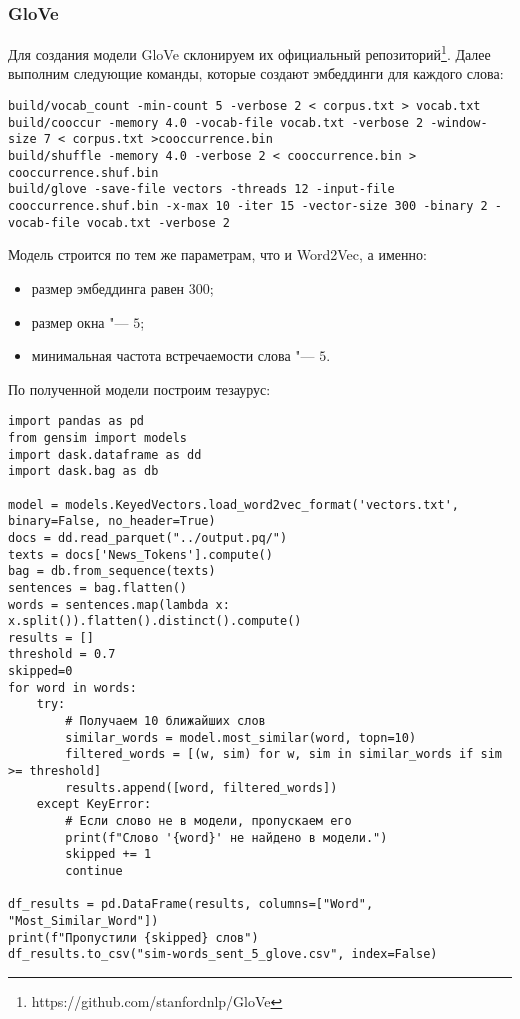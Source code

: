 \documentclass[coursework]{SCWorks}
\begin{document}
\subsubsection{GloVe}
Для создания модели GloVe склонируем их официальный репозиторий\footnote{https://github.com/stanfordnlp/GloVe}. Далее выполним следующие команды, которые создают эмбеддинги для каждого слова:
\begin{verbatim}
build/vocab_count -min-count 5 -verbose 2 < corpus.txt > vocab.txt
build/cooccur -memory 4.0 -vocab-file vocab.txt -verbose 2 -window-size 7 < corpus.txt >cooccurrence.bin
build/shuffle -memory 4.0 -verbose 2 < cooccurrence.bin > cooccurrence.shuf.bin
build/glove -save-file vectors -threads 12 -input-file cooccurrence.shuf.bin -x-max 10 -iter 15 -vector-size 300 -binary 2 -vocab-file vocab.txt -verbose 2
\end{verbatim}

Модель строится по тем же параметрам, что и Word2Vec, а именно:
\begin{itemize}
    \item размер эмбеддинга равен $300$;
    \item размер окна "--- $5$;
    \item минимальная частота встречаемости слова "--- $5$.
\end{itemize}

По полученной модели построим тезаурус:
\begin{verbatim}
import pandas as pd
from gensim import models
import dask.dataframe as dd
import dask.bag as db

model = models.KeyedVectors.load_word2vec_format('vectors.txt', binary=False, no_header=True)
docs = dd.read_parquet("../output.pq/")
texts = docs['News_Tokens'].compute()
bag = db.from_sequence(texts)
sentences = bag.flatten()
words = sentences.map(lambda x: x.split()).flatten().distinct().compute()
results = []
threshold = 0.7
skipped=0
for word in words:
    try:
        # Получаем 10 ближайших слов
        similar_words = model.most_similar(word, topn=10)
        filtered_words = [(w, sim) for w, sim in similar_words if sim >= threshold]
        results.append([word, filtered_words])
    except KeyError:
        # Если слово не в модели, пропускаем его
        print(f"Слово '{word}' не найдено в модели.")
        skipped += 1
        continue

df_results = pd.DataFrame(results, columns=["Word", "Most_Similar_Word"])
print(f"Пропустили {skipped} слов")
df_results.to_csv("sim-words_sent_5_glove.csv", index=False)
\end{verbatim}
\end{document}
